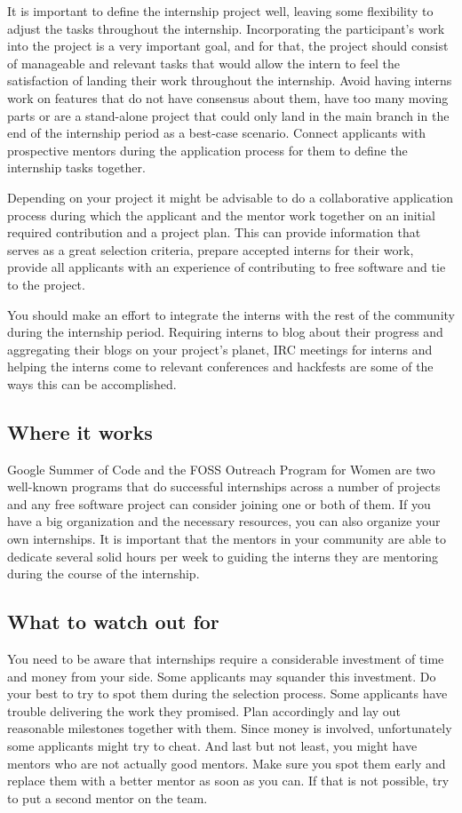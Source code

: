 It is important to define the internship project well, leaving some flexibility to adjust the tasks throughout the internship. Incorporating the participant’s work into the project is a very important goal, and for that, the project should consist of manageable and relevant tasks that would allow the intern to feel the satisfaction of landing their work throughout the internship. Avoid having interns work on features that do not have consensus about them, have too many moving parts or are a stand-alone project that could only land in the main branch in the end of the internship period as a best-case scenario. Connect applicants with prospective mentors during the application process for them to define the internship tasks together.

Depending on your project it might be advisable to do a collaborative application process during which the applicant and the mentor work together on an initial required contribution and a project plan. This can provide information that serves as a great selection criteria, prepare accepted interns for their work, provide all applicants with an experience of contributing to free software and tie to the project.

You should make an effort to integrate the interns with the rest of the community during the internship period. Requiring interns to blog about their progress and aggregating their blogs on your project’s planet, IRC meetings for interns and helping the interns come to relevant conferences and hackfests are some of the ways this can be accomplished.

\subsection{Where it works}
Google Summer of Code and the FOSS Outreach Program for Women are two well-known programs that do successful internships across a number of projects and any free software project can consider joining one or both of them. If you have a big organization and the necessary resources, you can also organize your own internships. It is important that the mentors in your community are able to dedicate several solid hours per week to guiding the interns they are mentoring during the course of the internship.

\subsection{What to watch out for}
You need to be aware that internships require a considerable investment of time and money from your side. Some applicants may squander this investment. Do your best to try to spot them during the selection process. Some applicants have trouble delivering the work they promised. Plan accordingly and lay out reasonable milestones together with them. Since money is involved, unfortunately some applicants might try to cheat. And last but not least, you might have mentors who are not actually good mentors. Make sure you spot them early and replace them with a better mentor as soon as you can. If that is not possible, try to put a second mentor on the team.

